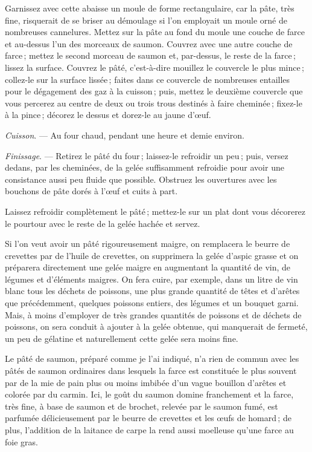 Garnissez avec cette abaisse un moule de forme rectangulaire, car la pâte, très
fine, risquerait de se briser au démoulage si l’on employait un moule orné de
nombreuses cannelures. Mettez sur la pâte au fond du moule une couche de farce
et au-dessus l'un des morceaux de saumon. Couvrez avec une autre couche de
farce ; mettez le second morceau de saumon et, par-dessus, le reste de la
farce ; lissez la surface. Couvrez le pâté, c'est-à-dire mouillez le couvercle
le plus mince ; collez-le sur la surface lissée ; faites dans ce couvercle de
nombreuses entailles pour le dégagement des gaz à la cuisson ; puis, mettez le
deuxième couvercle que vous percerez au centre de deux ou trois trous destinés
à faire cheminée ; fixez-le à la pince ; décorez le dessus et dorez-le au jaune
d'œuf.

\medskip

\textit{Cuisson}. — Au four chaud, pendant une heure et demie environ.

\medskip

\textit{Finissage}. — Retirez le pâté du four ; laissez-le refroidir un peu ;
puis, versez dedans, par les cheminées, de la gelée suffisamment refroidie pour
avoir une consistance aussi peu fluide que possible. Obstruez les ouvertures
avec les bouchons de pâte dorés à l'œuf et cuits à part.

Laissez refroidir complètement le pâté ; mettez-le sur un plat dont vous
décorerez le pourtour avec le reste de la gelée hachée et servez.

Si l'on veut avoir un pâté rigoureusement maigre, on remplacera le beurre de
crevettes par de l'huile de crevettes, on supprimera la gelée d'aspic grasse et
on préparera directement une gelée maigre en augmentant la quantité de vin, de
légumes et d'éléments maigres. On fera cuire, par exemple, dans un litre de vin
blanc tous les déchets de poissons, une plus grande quantité de têtes et
d’arêtes que précédemment, quelques poissons entiers, des légumes et un bouquet
garni. Mais, à moins d'employer de très grandes quantités de poissons et de
déchets de poissons, on sera conduit à ajouter à la gelée obtenue, qui
manquerait de fermeté, un peu de gélatine et naturellement cette gelée sera
moins fine.

Le pâté de saumon, préparé comme je l'ai indiqué, n'a rien de commun avec les
pâtés de saumon ordinaires dans lesquels la farce est constituée le plus
souvent par de la mie de pain plus ou moins imbibée d’un vague bouillon
d’arêtes et colorée par du carmin. Ici, le goût du saumon domine franchement et
la farce, très fine, à base de saumon et de brochet, relevée par le saumon
fumé, est parfumée délicieusement par le beurre de crevettes et les œufs de
homard ; de plus, l'addition de la laitance de carpe la rend aussi moelleuse
qu'une farce au foie gras.


